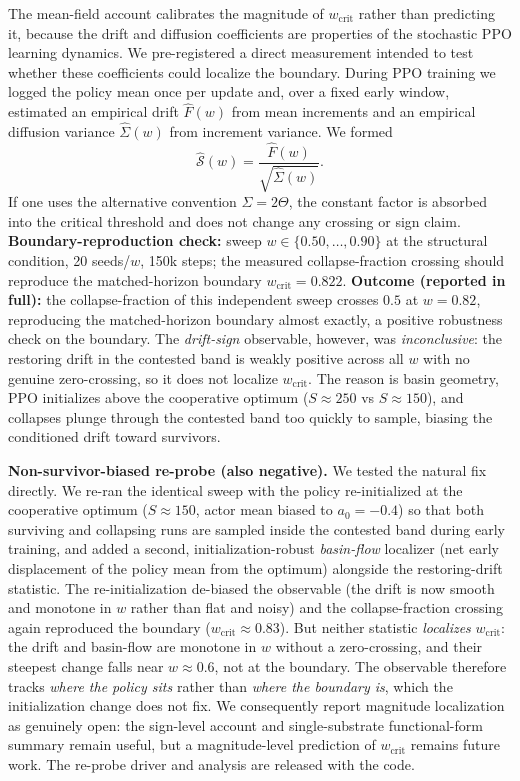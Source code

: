 \documentclass[letterpaper]{article} %
\theoremstyle{plain}
\newcommand{\wcrit}{w_{\mathrm{crit}}}
\begin{document}
The mean-field account calibrates the magnitude of $\wcrit$ rather than predicting it, because the
drift and diffusion coefficients are properties of the stochastic PPO learning dynamics. We
pre-registered a direct measurement intended to test whether these coefficients could localize the
boundary. During PPO training we logged the policy mean once per update and, over a fixed early
window, estimated an empirical drift $\widehat F(w)$ from mean increments and an empirical diffusion
variance $\widehat\Sigma(w)$ from increment variance. We formed
\begin{equation}
 \widehat{\mathcal S}(w)=\frac{\widehat F(w)}{\sqrt{\widehat\Sigma(w)}} .
\end{equation}
If one uses the alternative convention $\Sigma=2\Theta$, the constant factor is absorbed into the
critical threshold and does not change any crossing or sign claim. \textbf{Boundary-reproduction
check:} sweep $w\in\{0.50,\dots,0.90\}$ at the structural condition, 20 seeds/$w$, 150k steps; the
measured collapse-fraction crossing should reproduce the matched-horizon boundary
$\wcrit=0.822$. \textbf{Outcome (reported in full):} the collapse-fraction of this
independent sweep crosses $0.5$ at $w=0.82$, reproducing the matched-horizon boundary almost
exactly, a positive robustness check on the boundary. The \emph{drift-sign} observable,
however, was \emph{inconclusive}: the restoring drift in the contested band is weakly positive
across all $w$ with no genuine zero-crossing, so it does not localize $\wcrit$. The reason is
basin geometry, PPO initializes above the cooperative optimum ($S{\approx}250$ vs
$S{\approx}150$), and collapses plunge through the contested band too quickly to sample,
biasing the conditioned drift toward survivors.

\textbf{Non-survivor-biased re-probe (also negative).} We tested the natural fix directly. We
re-ran the identical sweep with the policy re-initialized at the cooperative optimum
($S{\approx}150$, actor mean biased to $a_0{=}{-}0.4$) so that both surviving and collapsing runs
are sampled inside the contested band during early training, and added a second,
initialization-robust \emph{basin-flow} localizer (net early displacement of the policy mean from
the optimum) alongside the restoring-drift statistic. The re-initialization de-biased the
observable (the drift is now smooth and monotone in $w$ rather than flat and noisy) and the
collapse-fraction crossing again reproduced the boundary ($\wcrit\approx0.83$). But neither
statistic \emph{localizes} $\wcrit$: the drift and basin-flow are monotone in $w$ without a
zero-crossing, and their steepest change falls near $w{\approx}0.6$, not at the boundary. The
observable therefore tracks \emph{where the policy sits} rather than \emph{where the boundary is},
which the initialization change does not fix. We consequently report magnitude localization as
genuinely open: the sign-level account and single-substrate functional-form summary remain useful,
but a magnitude-level prediction of $\wcrit$ remains future work. The re-probe driver and analysis are
released with the code.
\end{document}
